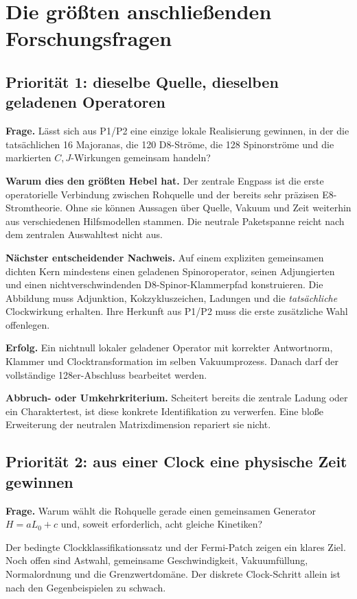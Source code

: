 \chapter{Die größten anschließenden Forschungsfragen}
\section{Priorität 1: dieselbe Quelle, dieselben geladenen Operatoren}
\textbf{Frage.} Lässt sich aus P1/P2 eine einzige lokale Realisierung gewinnen, in der die tatsächlichen 16 Majoranas, die 120 D8-Ströme, die 128 Spinorströme und die markierten $C,J$-Wirkungen gemeinsam handeln?

\textbf{Warum dies den größten Hebel hat.} Der zentrale Engpass ist die erste operatorielle Verbindung zwischen Rohquelle und der bereits sehr präzisen E8-Stromtheorie. Ohne sie können Aussagen über Quelle, Vakuum und Zeit weiterhin aus verschiedenen Hilfsmodellen stammen. Die neutrale Paketspanne reicht nach dem zentralen Auswahltest nicht aus.

\textbf{Nächster entscheidender Nachweis.} Auf einem expliziten gemeinsamen dichten Kern mindestens einen geladenen Spinoroperator, seinen Adjungierten und einen nichtverschwindenden D8-Spinor-Klammerpfad konstruieren. Die Abbildung muss Adjunktion, Kokzykluszeichen, Ladungen und die \emph{tatsächliche} Clockwirkung erhalten. Ihre Herkunft aus P1/P2 muss die erste zusätzliche Wahl offenlegen.

\textbf{Erfolg.} Ein nichtnull lokaler geladener Operator mit korrekter Antwortnorm, Klammer und Clocktransformation im selben Vakuumprozess. Danach darf der vollständige 128er-Abschluss bearbeitet werden.

\textbf{Abbruch- oder Umkehrkriterium.} Scheitert bereits die zentrale Ladung oder ein Charaktertest, ist diese konkrete Identifikation zu verwerfen. Eine bloße Erweiterung der neutralen Matrixdimension repariert sie nicht.

\section{Priorität 2: aus einer Clock eine physische Zeit gewinnen}
\textbf{Frage.} Warum wählt die Rohquelle gerade einen gemeinsamen Generator $H=aL_0+c$ und, soweit erforderlich, acht gleiche Kinetiken?

Der bedingte Clockklassifikationssatz und der Fermi-Patch zeigen ein klares Ziel. Noch offen sind Astwahl, gemeinsame Geschwindigkeit, Vakuumfüllung, Normalordnung und die Grenzwertdomäne. Der diskrete Clock-Schritt allein ist nach den Gegenbeispielen zu schwach.

